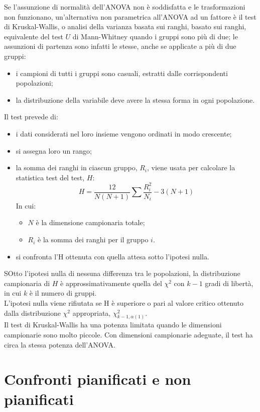 \documentclass[10pt, draft]{book}
\newcommand{\tightlist}{%
\setlength{\itemsep}{1pt}\setlength{\parskip}{0pt}\setlength{\parsep}{0pt}}
\begin{document}
Se l'assunzione di normalità dell'ANOVA non è soddisfatta e le trasformazioni non funzionano, un'alternativa non parametrica all'ANOVA ad un fattore è il test di Kruskal-Wallis, o analisi della varianza basata sui ranghi, basato sui ranghi, equivalente del test $U$ di Mann-Whitney quando i gruppi sono più di due; le assunzioni di partenza sono infatti le stesse, anche se applicate a più di due gruppi:
\begin{itemize}\tightlist
    \item i campioni di tutti i gruppi sono casuali, estratti dalle corrispondenti popolazioni;
    \item la distribuzione della variabile deve avere la stessa forma in ogni popolazione.
\end{itemize}
Il test prevede di:
\begin{itemize}\tightlist
    \item i dati considerati nel loro insieme vengono ordinati in modo crescente;
    \item si assegna loro un rango;
    \item la somma dei ranghi in ciascun gruppo, $R_i$, viene usata per calcolare la statistica test del test, $H$:
    \begin{equation}
        H = \frac{12}{N(N+1)}\sum{\frac{R_i^2}{N_i}}-3(N+1)
    \end{equation}
    In cui:
    \begin{itemize}\tightlist
        \item $N$ è la dimensione campionaria totale;
        \item $R_i$ è la somma dei ranghi per il gruppo $i$.
    \end{itemize}
    \item si confronta l'H ottenuta con quella attesa sotto l'ipotesi nulla.
\end{itemize}
SOtto l'ipotesi nulla di nessuna differenza tra le popolazioni, la distribuzione campionaria di $H$ è approssimativamente quella del $\chi^2$ con $k-1$ gradi di libertà, in cui $k$ è il numero di gruppi.\\
L'ipotesi nulla viene rifiutata se H è superiore o pari al valore critico ottenuto dalla distribuzione $\chi^2$ appropriata, $\chi^2_{k-1,\alpha(1)}$.\\
Il test di Kruskal-Wallis ha una potenza limitata quando le dimensioni campionarie sono molto piccole. Con dimensioni campionarie adeguate, il test ha circa la stessa potenza dell'ANOVA.

\section{Confronti pianificati e non pianificati}
\end{document}
